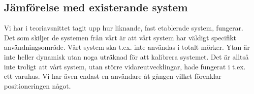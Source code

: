 \documentclass[11pt, a4paper]{report}
\begin{document}


\subsection{Jämförelse med existerande system}
Vi har i teoriavsnittet tagit upp hur liknande, fast etablerade system, fungerar. Det som skiljer de systemen från vårt är att vårt system har väldigt specifikt användningsområde. Vårt system ska t.ex. inte användas i totalt mörker. Ytan är inte heller dynamisk utan noga uträknad för att kalibrera systemet. Det är alltså inte troligt att vårt system, utan större vidareutvecklingar, hade fungerat i t.ex. ett varuhus. Vi har även endast en användare åt gången vilket förenklar positioneringen något.
\end{document}
